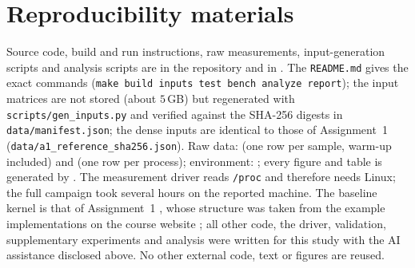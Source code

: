 \section{Reproducibility materials}
\label{sec:materials}
Source code, build and run instructions, raw measurements, input-generation scripts and analysis scripts are in the repository \repourl{} and in . The \texttt{README.md} gives the exact commands
(\texttt{make build inputs test bench analyze report}); the input matrices are not stored (about $5$\,GB) but regenerated with \texttt{scripts/gen\_inputs.py} and verified against the SHA-256 digests in \texttt{data/manifest.json}; the dense inputs are identical to those of Assignment~1 (\texttt{data/a1\_reference\_sha256.json}).
Raw data:  (one row per sample, warm-up included) and  (one row per process); environment: ; every figure and table is generated by . The measurement driver reads \texttt{/proc} and therefore needs Linux;
the full campaign took several hours on the reported machine. The baseline kernel is that of Assignment~1 \cite{a1}, whose structure was taken from the example implementations on the course website \cite{course}; all other code, the driver, validation, supplementary experiments and analysis were written for this study with the AI assistance disclosed above.
No other external code, text or figures are reused.


